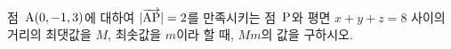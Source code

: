 점~$\mathrm{A}(0{,}\mkern3mu\mathopen{}-1{,}\mkern3mu\mathopen{}3)$에 대하여 $|\overrightarrow{\mathrm{AP}}|=2$를 만족시키는 점~$\mathrm{P}$와 평면 $x+y+z=8$ 사이의 거리의 최댓값을 $M$, 최솟값을 $m$이라 할 때, $Mm$의 값을 구하시오.
